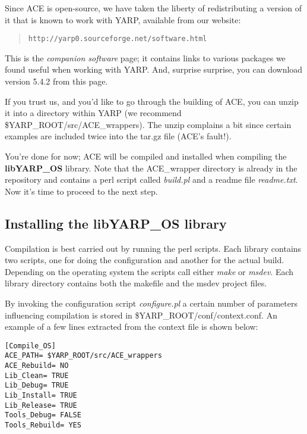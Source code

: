 
Since ACE is open-source, we have taken the liberty of redistributing 
a version of it that is known to work with YARP, available from our 
website:

\begin{quote}
{\tt http://yarp0.sourceforge.net/software.html}
\end{quote}

This is the {\em companion software} page; it contains links to various packages we found useful when working with YARP. And, surprise surprise, you can download version 5.4.2 from this page.

If you trust us, and you'd like to go through the building of ACE, you can unzip it into a directory within YARP (we recommend \$YARP\_ROOT/src/ACE\_wrappers). The unzip complains a bit since certain examples are included twice into the tar.gz file (ACE's fault!).

You're done for now; ACE will be compiled and installed when compiling the {\bf libYARP\_OS} library. Note that the ACE\_wrapper directory is already in the repository and contains a perl script called {\em build.pl} and a readme file {\em readme.txt}. Now it's time to proceed to the next step.

\subsection{Installing the libYARP\_OS library}
Compilation is best carried out by running the perl scripts. Each library contains two scripts, one for doing the configuration and another for the actual build. Depending on the operating system the scripts call either {\em make} or {\em msdev}. Each library directory contains both the makefile and the msdev project files.

By invoking the configuration script {\em configure.pl} a certain number of parameters influencing compilation is stored in \$YARP\_ROOT/conf/context.conf. An example of a few lines extracted from the context file is shown below:

\begin{verbatim}
[Compile_OS]
ACE_PATH= $YARP_ROOT/src/ACE_wrappers
ACE_Rebuild= NO
Lib_Clean= TRUE
Lib_Debug= TRUE
Lib_Install= TRUE
Lib_Release= TRUE
Tools_Debug= FALSE
Tools_Rebuild= YES
\end{verbatim}

